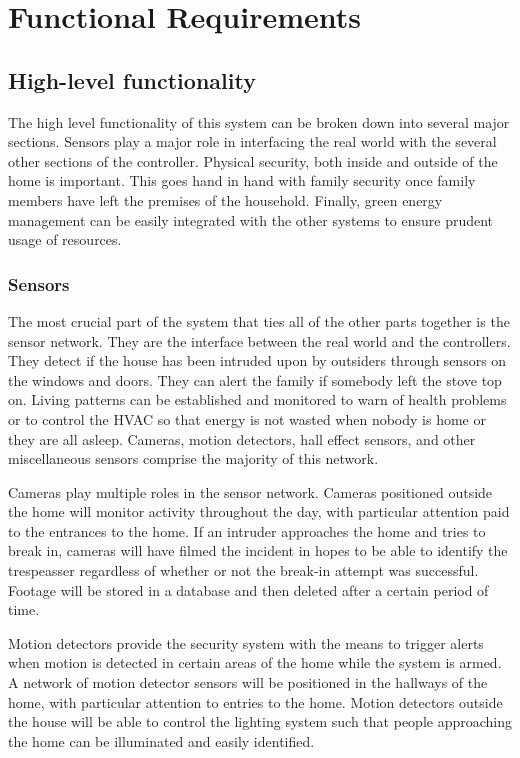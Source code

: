 \documentclass{report}
\begin{document}
\chapter{Functional Requirements}

\section{High-level functionality}
The high level functionality of this system can be broken down into several
major sections. Sensors play a major role in interfacing the real world with
the several other sections of the controller. Physical security, both inside
and outside of the home is important. This goes hand in hand with family
security once family members have left the premises of the household. Finally,
green energy management can be easily integrated with the other systems to
ensure prudent usage of resources. 

\subsection{Sensors}

The most crucial part of the system that ties all of the other parts together
is the sensor network. They are the interface between the real world and the
controllers. They detect if the house has been intruded upon by outsiders
through sensors on the windows and doors. They can alert the family if somebody
left the stove top on. Living patterns can be established and monitored to warn
of health problems or to control the HVAC so that energy is not wasted when
nobody is home or they are all asleep. Cameras, motion detectors, hall effect
sensors, and other miscellaneous sensors comprise the majority of this network.

Cameras play multiple roles in the sensor network. Cameras positioned outside
the home will monitor activity throughout the day, with particular attention paid
to the entrances to the home. If an intruder approaches the home and tries to
break in, cameras will have filmed the incident in hopes to be able to identify
the trespeasser regardless of whether or not the break-in attempt was successful.
Footage will be stored in a database and then deleted after a certain period of
time.

Motion detectors provide the security system with the means to trigger alerts 
when motion is detected in certain areas of the home while the system is armed.
A network of motion detector sensors will be positioned in the hallways of the
home, with particular attention to entries to the home. Motion detectors
outside the house will be able to control the lighting system such that people
approaching the home can be illuminated and easily identified.
\end{document}
